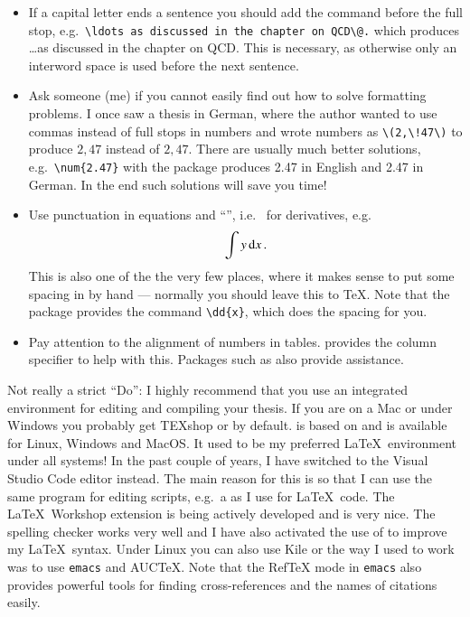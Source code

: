 \begin{itemize}
\item If a capital letter ends a sentence you should add the
  command  before the full stop, e.g.\
  \verb|\ldots as discussed in the chapter on QCD\@.|
  which produces \ldots as discussed in the chapter on QCD\@.
  This is necessary, as otherwise only an interword space is used
  before the next sentence.

\item Ask someone (me) if you cannot easily find out how to solve
  formatting problems. I once saw a thesis in German, where the
  author wanted to use commas instead of full stops in numbers and
  wrote numbers as \verb+\(2,\!47\)+ to produce \(2,\!47\) instead of
  \(2,47\). There are usually much better solutions, e.g.\
  \verb+\num{2.47}+ with the  package produces
  \num{2.47} in English and \foreignlanguage{ngerman}{\num{2.47}} in
  German. In the end such solutions will save you time!

\item Use punctuation in equations and \enquote{\dif}, i.e.\  for
  derivatives, e.g.
  \begin{equation*}
    \int y\, \text{d} x\,.
  \end{equation*}
  This is also one of the the very few places, where it makes sense
  to put some spacing in by hand --- normally you should leave this to \TeX.
  Note that the \Package{physics} package provides the command \verb|\dd{x}|,
  which does the spacing for you.

\item Pay attention to the alignment of numbers in
  tables.  provides the  column specifier to
  help with this. Packages such as  also provide assistance.
\end{itemize}

Not really a strict \enquote{Do}: I highly recommend that you use an
integrated environment for editing and compiling your thesis.
If you are on a Mac or under Windows you probably get TEXshop or
\TeXLive by default.
\TeXstudio is based on \TeXmaker and is available for Linux,
Windows and MacOS\@.
It used to be my preferred \LaTeX\ environment under all systems!
In the past couple of years,
I have switched to the Visual Studio Code editor instead.
The main reason for this is so that I can use the same program
for editing scripts, e.g.\ a \File{Makefile} as I use for \LaTeX\ code.
The \textsf{\LaTeX\ Workshop} extension is being actively developed
and is very nice.
The \Package{Spell Right} spelling checker works very well
and I have also activated the use of  to improve my \LaTeX\ syntax.
Under Linux you can also use Kile\index{kile} or the way I used to work
was to use \texttt{emacs}\index{emacs} and AUCTeX.
Note that the RefTeX\index{RefTeX} mode in \texttt{emacs} also provides powerful
tools for finding cross-references and the names of citations easily.

